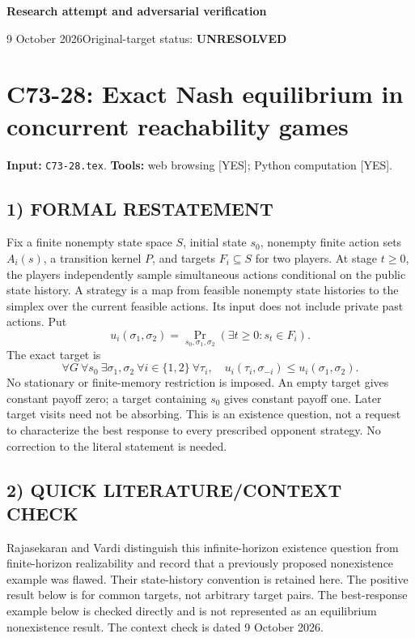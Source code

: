\documentclass[11pt,a4paper]{article}
\theoremstyle{definition}
\theoremstyle{remark}
\begin{document}
{\large\bfseries Research attempt and adversarial verification}\par
9 October 2026\hfill Original-target status: \textbf{UNRESOLVED}\par
\section{C73-28: Exact Nash equilibrium in concurrent reachability games}
\label{sec:C73-28}
\noindent\textbf{Input:} \texttt{C73-28.tex}. \quad\textbf{Tools:} web browsing [YES]; Python computation [YES].
\subsection*{1) FORMAL RESTATEMENT}
Fix a finite nonempty state space $S$, initial state $s_0$, nonempty finite action sets $A_i(s)$, a transition kernel $P$, and targets $F_i\subseteq S$ for two players. At stage $t\geq0$, the players independently sample simultaneous actions conditional on the public state history. A strategy is a map from feasible nonempty state histories to the simplex over the current feasible actions. Its input does not include private past actions. Put
\[
 u_i(\sigma_1,\sigma_2)=\Pr_{s_0,\sigma_1,\sigma_2}(\exists t\geq0:s_t\in F_i).
\]
The exact target is
\[
 \forall G\ \forall s_0\ \exists\sigma_1,\sigma_2\ \forall i\in\{1,2\}
 \ \forall\tau_i,\quad
 u_i(\tau_i,\sigma_{-i})\leq u_i(\sigma_1,\sigma_2).
\]
No stationary or finite-memory restriction is imposed. An empty target gives constant payoff zero; a target containing $s_0$ gives constant payoff one. Later target visits need not be absorbing. This is an existence question, not a request to characterize the best response to every prescribed opponent strategy. No correction to the literal statement is needed.

\subsection*{2) QUICK LITERATURE/CONTEXT CHECK}
Rajasekaran and Vardi \cite{reach-source} distinguish this infinite-horizon existence question from finite-horizon realizability and record that a previously proposed nonexistence example was flawed. Their state-history convention is retained here. The positive result below is for common targets, not arbitrary target pairs. The best-response example below is checked directly and is not represented as an equilibrium nonexistence result. The context check is dated 9 October 2026.
\end{document}
